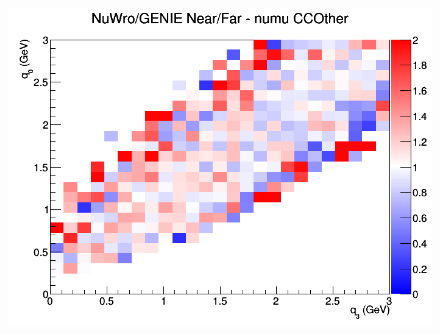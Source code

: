 \begin{figure}[h]
\endminipage
{}
\includegraphics[width=\linewidth]{eff_q0_q3/LAr/ratios/CCOther_NuWro_GENIE_numu_NF_q3_q0.png}
\endminipage
\newline
\end{figure}
\clearpage

